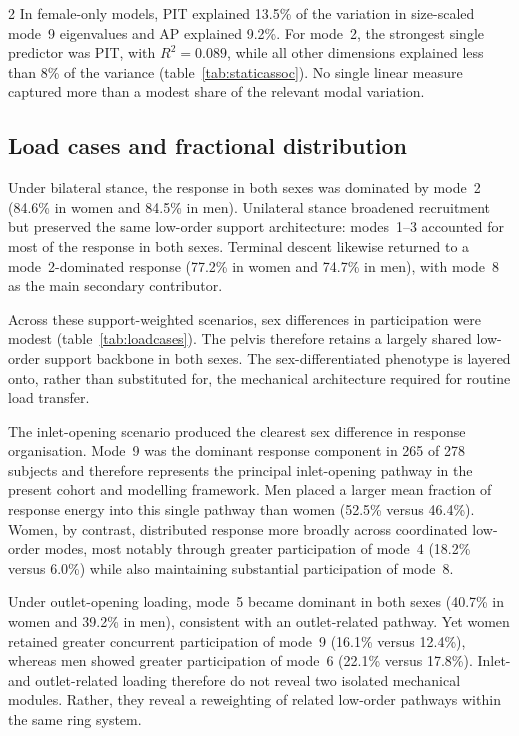 \documentclass[openacc]{rsproca_new}
\begin{document}
\begin{multicols}{2}
In female-only models, PIT explained 13.5\% of the variation in size-scaled mode~9 eigenvalues and AP explained 9.2\%. For mode~2, the strongest single predictor was PIT, with $R^2=0.089$, while all other dimensions explained less than 8\% of the variance (table~\ref{tab:staticassoc}). No single linear measure captured more than a modest share of the relevant modal variation.


\subsection{Load cases and fractional distribution}

Under bilateral stance, the response in both sexes was dominated by mode~2 (84.6\% in women and 84.5\% in men). Unilateral stance broadened recruitment but preserved the same low-order support architecture: modes~1--3 accounted for most of the response in both sexes. Terminal descent likewise returned to a mode~2-dominated response (77.2\% in women and 74.7\% in men), with mode~8 as the main secondary contributor.

Across these support-weighted scenarios, sex differences in participation were modest (table~\ref{tab:loadcases}). The pelvis therefore retains a largely shared low-order support backbone in both sexes. The sex-differentiated phenotype is layered onto, rather than substituted for, the mechanical architecture required for routine load transfer.

The inlet-opening scenario produced the clearest sex difference in response organisation. Mode~9 was the dominant response component in 265 of 278 subjects and therefore represents the principal inlet-opening pathway in the present cohort and modelling framework. Men placed a larger mean fraction of response energy into this single pathway than women (52.5\% versus 46.4\%). Women, by contrast, distributed response more broadly across coordinated low-order modes, most notably through greater participation of mode~4 (18.2\% versus 6.0\%) while also maintaining substantial participation of mode~8.

Under outlet-opening loading, mode~5 became dominant in both sexes (40.7\% in women and 39.2\% in men), consistent with an outlet-related pathway. Yet women retained greater concurrent participation of mode~9 (16.1\% versus 12.4\%), whereas men showed greater participation of mode~6 (22.1\% versus 17.8\%). Inlet- and outlet-related loading therefore do not reveal two isolated mechanical modules. Rather, they reveal a reweighting of related low-order pathways within the same ring system.


\end{multicols}
\end{document}
